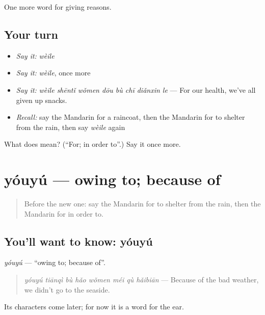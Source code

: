 \begin{grammarlens}[title={What you've built}]
One more word for giving reasons.
\end{grammarlens}

\subsection*{Your turn}
\begin{itemize}
\raggedright
  \item \emph{Say it:} \emph{wèile}
  \item \emph{Say it:} \emph{wèile}, once more
  \item \emph{Say it:} \emph{wèile shēntǐ wǒmen dōu bù chī diǎnxin le} — For our health, we've all given up snacks.
  \item \emph{Recall:} say the Mandarin for a raincoat, then the Mandarin for to shelter from the rain, then say \emph{wèile} again
\end{itemize}

\begin{tcolorbox}[breakable,colback=teal!4,colframe=teal!35!black,title={Before you move on}]
What does  mean? (\textquotedblleft{}For; in order to\textquotedblright{}.) Say it once more.
\end{tcolorbox}
\section[yóuyú]{yóuyú — owing to; because of}

\label{lesson:ZH-C235-youyu}



\begin{quote}
Before the new one: say the Mandarin for to shelter from the rain, then the Mandarin for in order to.
\end{quote}

\subsection*{You'll want to know: yóuyú}
\emph{yóuyú} — \textquotedblleft{}owing to; because of\textquotedblright{}.

\begin{quote}
\emph{yóuyú tiānqì bù hǎo wǒmen méi qù hǎibiān} — Because of the bad weather, we didn't go to the seaside.
\end{quote}

Its characters come later; for now it is a word for the ear.

